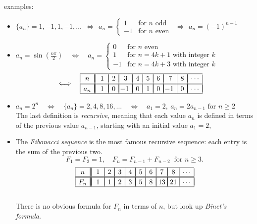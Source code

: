 \documentclass[11pt]{article}
\begin{document}
\noindent
{\sc examples:}
\begin{itemize}
\item $\{a_n\}= 1, -1, 1, -1,\ldots
\ \ \Longleftrightarrow\ \ 
a_n = \left\{\!\!\begin{array}{rl}
1 & \text{for $n$ odd}\\
-1 & \text{for $n$ even}
\end{array}
\right.
\ \ \Longleftrightarrow\ \ 
a_n = (-1)^{n-1}
$

\item 
$a_n=\sin\!\left(\frac{n\pi}{2} \right)
\quad\Longleftrightarrow\quad
a_n = \left\{
\!\!\begin{array}{rl}
0 & \text{for $n$ even}\\
1 & \text{for $n=4k+1$ with integer $k$}\\
-1 & \text{for $n=4k+3$ with integer $k$}
\end{array}
\right.
$
$$\hspace{-.3in}
\quad\Longleftrightarrow\quad
\begin{array}{|c||c|c|c|c|c|c|c|c|c|} 
\hline  &&&&&&&& \\[-1.1em] 
n & \,1\, & 2 & 3 & 4 & 5 & 6 & 7 & 8 &\cdots\\
\hline&&&&&&&&&\\[-1.1em] \hline  &&&&&&&& \\[-1.1em] 
a_n & 1 & 0 & \!\!-1 & 0 & 1 & 0 & \!\!-1 & 0 & \cdots\\
\hline
\end{array}$$

\item $a_n = 2^n 
\quad\Longleftrightarrow\quad
\{a_n\} = 2, 4, 8, 16, \ldots
\quad\Longleftrightarrow\quad
a_1 = 2,\ a_n=2a_{n-1} \text{ for $n\geq 2$}
$
\\[.5em]
The last definition is {\it recursive}, meaning that each value $a_n$ is defined in terms of the previous value $a_{n-1}$, starting with an initial value $a_1=2$,  

\newpage

\item The {\it Fibonacci sequence} is the most famous recursive sequence:
each entry is the sum of the previous two.
$$
F_1 = F_2 = 1,\quad F_n=F_{n-1}+ F_{n-2} \ \text{ for $n\geq 3$}.
$$
$$
\begin{array}{|c||c|c|c|c|c|c|c|c|c|} 
\hline  &&&&&&&& \\[-1.1em] 
n & \,1\, & 2 & 3 & 4 & 5 & 6 & 7 & 8 &\cdots\\
\hline&&&&&&&&&\\[-1.1em] \hline  &&&&&&&& \\[-1.1em] 
F_n & 1 & 1 & 2 & 3 & 5 & 8 & \!13\! & \!21\! & \cdots\\
\hline
\end{array}
$$
\\[.3em]
There is no obvious formula for $F_n$ in terms of $n$, but look up {\it Binet's formula}. 

\end{itemize} 
\end{document}
